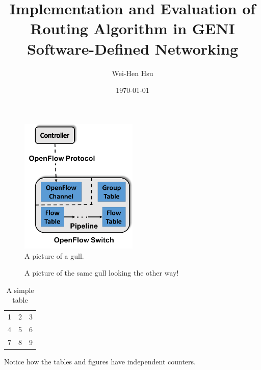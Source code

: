 \documentclass[a4paper,12pt]{report}
\title{Implementation and Evaluation of Routing Algorithm in GENI Software-Defined Networking}
\author{Wei-Hen Hsu}
\date{\today}
\begin{document}
    \maketitle{}
    \tableofcontents{}
    \begin{figure}
      \caption{A picture of a gull.}
      \centering
        \includegraphics[width=0.5\textwidth]{OpenFlow.png}
    \end{figure}
    
    \begin{figure}
      \centering
      \caption{A picture of the same gull
               looking the other way!}
    \end{figure}
    
    \begin{table}
      \centering
        \begin{tabular}{| l c r |}
        \hline
        1 & 2 & 3 \\
        4 & 5 & 6 \\
        7 & 8 & 9 \\
        \hline
        \end{tabular}
      \caption{A simple table}
    \end{table}
    
    Notice how the tables and figures
    have independent counters.
    
    
\end{document}
